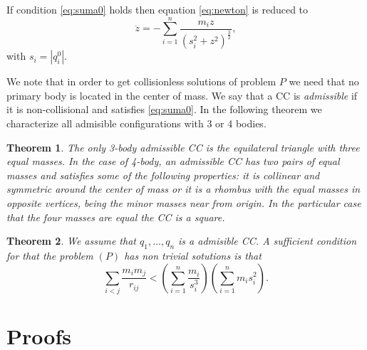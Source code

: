 \documentclass[twoside]{article}
\newtheorem{thm}{Theorem}[section]
\theoremstyle{remark}
\begin{document}
If condition \eqref{eq:suma0} holds then equation \eqref{eq:newton} is reduced to
\begin{equation}\label{eq:eq_new_red}
 \ddot{z}=-\sum_{i=1 }^n\frac{m_iz}{(s_i^2+z^2)^{\frac32}},
\end{equation}
with  $s_i=|q_i^0|$.



We note that in order to get collisionless solutions of problem $P$ we need that no primary body is located in the center of mass. We say that a
CC is \emph{admissible} if it is non-collisional and satisfies \eqref{eq:suma0}. In the following theorem we characterize all admisible configurations with 3 or 4 bodies.

\begin{thm}\label{thm:caracterizacion}
The only 3-body admissible CC is the equilateral triangle with three equal masses. In the case of 4-body, an admissible CC  has two pairs of equal masses and satisfies some of the following properties: it is collinear and symmetric around the center of mass or it is a rhombus with the equal masses in opposite vertices, being the minor masses near from origin. In the particular case that the four masses are equal the CC is a square.
\end{thm}

\begin{thm}\label{thm:prin_ine} We assume that $q_1,\ldots,q_n$ is a admisible CC. A sufficient condition for that the problem $(P)$ has non trivial sotutions is that
\begin{equation}\label{eq:ine_prin}
 \sum_{i<j}\frac{m_im_j}{r_{ij}}<\left(\sum_{i=1}^n\frac{m_i}{s_i^3}\right)\left(\sum_{i=1}^nm_is_i^2\right).
\end{equation}



\end{thm}






\section{Proofs}
\end{document}

